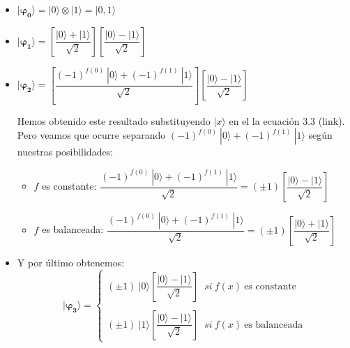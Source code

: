 \begin{itemize}
    \item $\mathbf{|\varphi_{0}\rangle} = |0\rangle \otimes |1\rangle = |0,1\rangle$

    \vspace{5pt}

    \item  $\mathbf{|\varphi_{1}\rangle} = \left[ \dfrac{|0\rangle + |1\rangle}{\sqrt{2}}\right] \left[ \dfrac{|0\rangle - |1\rangle}{\sqrt{2}}\right]$

    \vspace{5pt}

    \item $\mathbf{|\varphi_{2}\rangle} = \left[ \dfrac{(-1)^{f(0)}\:|0\rangle + (-1)^{f(1)}\:|1\rangle}{\sqrt{2}}\right] \left[ \dfrac{|0\rangle - |1\rangle}{\sqrt{2}}\right]$\newline 
    
    Hemos obtenido este resultado substituyendo $|x\rangle$ en el la ecuación 3.3 (link). Pero veamos que ocurre separando $(-1)^{f(0)}\:|0\rangle + (-1)^{f(1)}\:|1\rangle$ según nuestras posibilidades:
    \begin{itemize}
        \item $f$ es constante: $\dfrac{(-1)^{f(0)}\:|0\rangle + (-1)^{f(1)}\:|1\rangle}{\sqrt{2}} = (\pm 1)\left[ \dfrac{|0\rangle - |1\rangle}{\sqrt{2}}\right]$

        \vspace{5pt}
        
        \item $f$ es balanceada: $\dfrac{(-1)^{f(0)}\:|0\rangle + (-1)^{f(1)}\:|1\rangle}{\sqrt{2}} = (\pm 1)\left[ \dfrac{|0\rangle + |1\rangle}{\sqrt{2}}\right]$

    \end{itemize}

    \vspace{5pt}
    
    \item Y por último obtenemos:
    \begin{equation}\mathbf{|\varphi_{3}\rangle} = \begin{cases} (\pm 1)\:|0\rangle \left[ \dfrac{|0\rangle - |1\rangle}{\sqrt{2}}\right] \;\; si \: f(x)\:\text{es constante} \\ \\ (\pm 1)\:|1\rangle \left[ \dfrac{|0\rangle - |1\rangle}{\sqrt{2}}\right] \;\; si \: f(x)\:\text{es balanceada} \end{cases}\end{equation}
\end{itemize}

